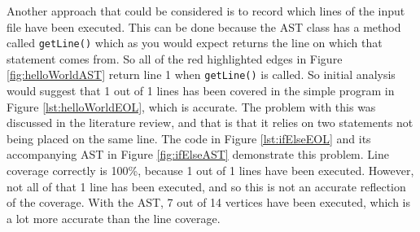 Another approach that could be considered is to record which lines of the input file have been executed. This can be done because the AST class has a method called \verb+getLine()+ which as you would expect returns the line on which that statement comes from. So all of the red highlighted edges in Figure \ref{fig:helloWorldAST} return line 1 when \verb|getLine()| is called. So initial analysis would suggest that 1 out of 1 lines has been covered in the simple program in Figure \ref{lst:helloWorldEOL}, which is accurate. The problem with this was discussed in the literature review, and that is that it relies on two statements not being placed on the same line. The code in Figure \ref{lst:ifElseEOL} and its accompanying AST in Figure \ref{fig:ifElseAST} demonstrate this problem. Line coverage correctly is 100\%, because 1 out of 1 lines have been executed. However, not all of that 1 line has been executed, and so this is not an accurate reflection of the coverage. With the AST, 7 out of 14 vertices have been executed, which is a lot more accurate than the line coverage.

